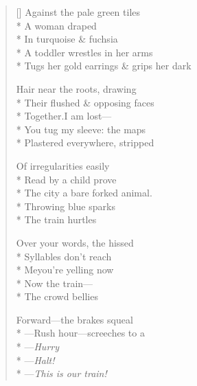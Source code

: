 \label{ch:leaning}
\settowidth{\versewidth}{Tugs her gold earrings \& grips her dark}
\begin{verse}[\versewidth]
Against the pale green tiles\\*
A woman draped\\*
In turquoise \& fuchsia\\*
A toddler wrestles in her arms\\*
Tugs her gold earrings \& grips her dark

Hair near the roots, drawing\\*
Their flushed \& opposing faces\\*
Together.\qquad I am lost---\\*
You tug my sleeve: the maps\\*
Plastered everywhere, stripped

Of irregularities easily\\*
Read by a child prove\\*
The city a bare forked animal.\\*
Throwing blue sparks\\*
The train hurtles

Over your words, the hissed\\*
Syllables don't reach\\*
Me\qquad you're yelling now\\*
Now the train---\\*
The crowd bellies

Forward---the brakes squeal\\*
---Rush hour---screeches to a\\*
---\textit{Hurry}\\*
---\textit{Halt!}\\*
---\textit{This is our train!}
\end{verse}
